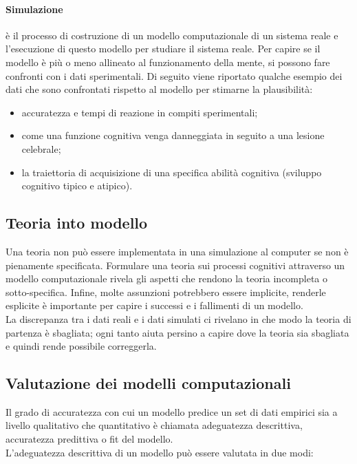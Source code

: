 \paragraph{Simulazione} è il processo di costruzione di un modello computazionale
di un sistema reale e l'esecuzione di questo modello per studiare il sistema
reale. Per capire se il modello è più o meno allineato al funzionamento della
mente, si possono fare confronti con i dati sperimentali. Di seguito viene
riportato qualche esempio dei dati che sono confrontati rispetto al modello per
stimarne la plausibilità:
\begin{itemize}
	\item accuratezza e tempi di reazione in compiti sperimentali;

	\item come una funzione cognitiva venga danneggiata in seguito a una lesione
		celebrale;

	\item la traiettoria di acquisizione di una specifica abilità cognitiva
		(sviluppo cognitivo tipico e atipico).
\end{itemize}

\subsection{Teoria into modello}

Una teoria non può essere implementata in una simulazione al computer se non è
pienamente specificata. Formulare una teoria sui processi cognitivi attraverso
un modello computazionale rivela gli aspetti che rendono la teoria incompleta o
sotto-specifica. Infine, molte assunzioni potrebbero essere implicite, renderle
esplicite è importante per capire i successi e i fallimenti di un modello.\\
La discrepanza tra i dati reali e i dati simulati ci rivelano in che modo la
teoria di partenza è sbagliata; ogni tanto aiuta persino a capire dove la teoria
sia sbagliata e quindi rende possibile correggerla.

\subsection{Valutazione dei modelli computazionali}

Il grado di accuratezza con cui un modello predice un set di dati empirici sia a
livello qualitativo che quantitativo è chiamata adeguatezza descrittiva,
accuratezza predittiva o fit del modello.\\
L'adeguatezza descrittiva di un modello può essere valutata in due modi:

